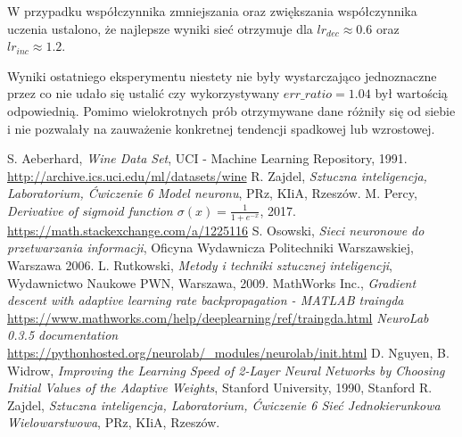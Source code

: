 \documentclass[a4paper,12pt]{article}
\numberwithin{equation}{section}
\begin{document}
W przypadku współczynnika zmniejszania oraz zwiększania współczynnika uczenia ustalono, że najlepsze wyniki sieć otrzymuje dla $lr_{dec} \approx 0.6$ oraz $lr_{inc} \approx 1.2$.

Wyniki ostatniego eksperymentu niestety nie były wystarczająco jednoznaczne przez co nie udało się ustalić czy wykorzystywany $err\_ratio=1.04$ był wartością odpowiednią. Pomimo wielokrotnych prób otrzymywane dane różniły się od siebie i nie pozwalały na zauważenie konkretnej tendencji spadkowej lub wzrostowej.


\pagebreak
\begin{thebibliography}{9}

     S. Aeberhard, \emph{Wine Data Set}, UCI - Machine Learning Repository, 1991.\\\href{http://archive.ics.uci.edu/ml/datasets/wine}{http://archive.ics.uci.edu/ml/datasets/wine}
     R. Zajdel, \emph{Sztuczna inteligencja, Laboratorium, Ćwiczenie 6 Model neuronu}, PRz, KIiA, Rzeszów.
     M. Percy, \emph{Derivative of sigmoid function $\sigma(x)=\frac{1}{1+e^{-x}}$}, 2017.\\\href{https://math.stackexchange.com/a/1225116}{https://math.stackexchange.com/a/1225116}
     S. Osowski, \emph{Sieci neuronowe do przetwarzania informacji}, Oficyna Wydawnicza Politechniki Warszawskiej, Warszawa 2006.
     L. Rutkowski, \emph{Metody i techniki sztucznej inteligencji}, Wydawnictwo Naukowe PWN, Warszawa, 2009.
     MathWorks Inc., \emph{Gradient descent with adaptive learning rate backpropagation - MATLAB traingda}\\\href{https://www.mathworks.com/help/deeplearning/ref/traingda.html}{https://www.mathworks.com/help/deeplearning/ref/traingda.html}
     \emph{NeuroLab 0.3.5 documentation}\\\href{https://pythonhosted.org/neurolab/_modules/neurolab/init.html}{https://pythonhosted.org/neurolab/\_modules/neurolab/init.html}
     D. Nguyen, B. Widrow, \emph{Improving the Learning Speed of 2-Layer Neural Networks by Choosing Initial Values of the Adaptive Weights}, Stanford University, 1990, Stanford
     R. Zajdel, \emph{Sztuczna inteligencja, Laboratorium, Ćwiczenie 6 Sieć Jednokierunkowa Wielowarstwowa}, PRz, KIiA, Rzeszów.
\end{thebibliography}
\end{document}
